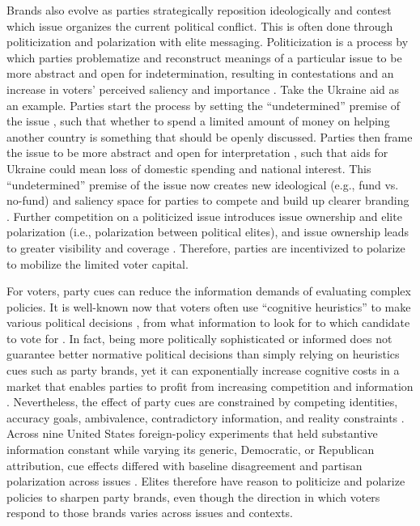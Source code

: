 Brands also evolve as parties strategically reposition ideologically and contest which issue organizes the current political conflict. This is often done through politicization and polarization with elite messaging. Politicization is a process by which parties problematize and reconstruct meanings of a particular issue to be more abstract and open for indetermination, resulting in contestations and an increase in voters' perceived saliency and importance \citep{mazzucaMakingItAbstract2023,slothuusWhenCanPolitical2010}. Take the Ukraine aid as an example. Parties start the process by setting the ``undetermined'' premise of the issue \citep{koselleckFuturesSemanticsHistorical2004}, such that whether to spend a limited amount of money on helping another country is something that should be openly discussed. Parties then frame the issue to be more abstract and open for interpretation \citep{borghiWordsSocialTools2014,Zurn2020}, such that aids for Ukraine could mean loss of domestic spending and national interest. This ``undetermined'' premise of the issue now creates new ideological (e.g., fund vs. no-fund) and saliency space for parties to compete and build up clearer branding \citep{eliasPositionSelectiveEmphasis2015,guinaudeauWhatIssueCompetition2014,slothuusMoreWeightingCognitive2008,Zurn2020}. Further competition on a politicized issue introduces issue ownership and elite polarization (i.e., polarization between political elites), and issue ownership leads to greater visibility and coverage \citep{campIssueOwnershipDeterminant2018}. Therefore, parties are incentivized to polarize to mobilize the limited voter capital.

For voters, party cues can reduce the information demands of evaluating complex policies. It is well-known now that voters often use ``cognitive heuristics'' to make various political decisions \citep{adamsCompanyYouKeep2016,albrightDoesPoliticalKnowledge2009,banerjeeInformedVotersMake2011,lauAdvantagesDisadvantagesCognitive2001}, from what information to look for \citep{danceyPartyIdentificationIssue2010} to which candidate to vote for \citep{downsEconomicTheoryPolitical1957}. In fact, being more politically sophisticated or informed does not guarantee better normative political decisions than simply relying on heuristics cues such as party brands, yet it can exponentially increase cognitive costs in a market that enables parties to profit from increasing competition and information \citep{banerjeeInformedVotersMake2011,lauAdvantagesDisadvantagesCognitive2001}. Nevertheless, the effect of party cues are constrained by competing identities, accuracy goals, ambivalence, contradictory information, and reality constraints \citep{leeperPoliticalPartiesMotivated2014}. Across nine United States foreign-policy experiments that held substantive information constant while varying its generic, Democratic, or Republican attribution, cue effects differed with baseline disagreement and partisan polarization across issues \citep{guisingerMappingBoundariesElite2017}. Elites therefore have reason to politicize and polarize policies to sharpen party brands, even though the direction in which voters respond to those brands varies across issues and contexts.

